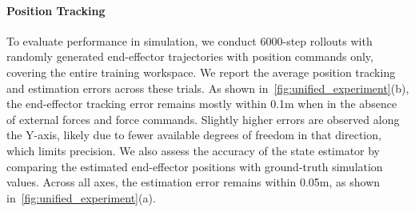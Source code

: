 \documentclass{article}
\begin{document}


 
\paragraph{Position Tracking}
To evaluate performance in simulation, we conduct 6000-step rollouts with randomly generated end-effector trajectories with position commands only, covering the entire training workspace. We report the average position tracking and estimation errors across these trials. As shown in~\cref{fig:unified_experiment}(b), the end-effector tracking error remains mostly within 0.1m when in the absence of external forces and force commands. Slightly higher errors are observed along the Y-axis, likely due to fewer available degrees of freedom in that direction, which limits precision. We also assess the accuracy of the state estimator by comparing the estimated end-effector positions with ground-truth simulation values. Across all axes, the estimation error remains within 0.05m, as shown in~\cref{fig:unified_experiment}(a).
\end{document}
